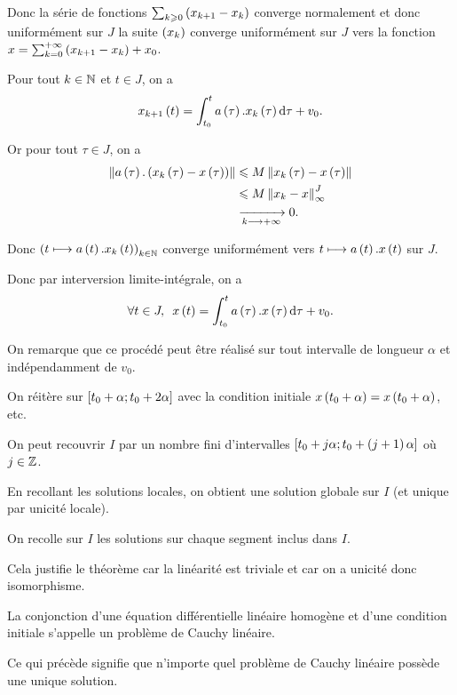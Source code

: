 \begin{dem}[Cas particulier : \(I=\intervii{c}{b}\) est un compact]
Donc la série de fonctions \(\sum_{k\geqslant0}\left(x_{k+1}-x_k\right)\) converge normalement et donc uniformément sur \(J\) \ie la suite \(\left(x_k\right)\) converge uniformément sur \(J\) vers la fonction \(x=\sum_{k=0}^{+\infty}\left(x_{k+1}-x_k\right)+x_0\).

Pour tout \(k\in\mathbb{N}\) et \(t\in J\), on a \[x_{k+1}\paren{t}=\int_{t_0}^ta\paren{\tau}.x_k\paren{\tau}\odif{\tau}+v_0.\]

Or pour tout \(\tau\in J\), on a \[\begin{aligned}
\norme{a\paren{\tau}.\paren{x_k\paren{\tau}-x\paren{\tau}}}&\leq M\norme{x_k\paren{\tau}-x\paren{\tau}} \\
&\leq M\norme{x_k-x}_\infty^J \\
&\tendqd{k\to\pinf}0.
\end{aligned}\]

Donc \(\left(t\longmapsto a\left(t\right).x_k\left(t\right)\right)_{k\in\mathbb{N}}\) converge uniformément vers \(t\longmapsto a\left(t\right).x\left(t\right)\) sur \(J\).

Donc par interversion limite-intégrale, on a \[\quantifs{\forall t\in J}x\paren{t}=\int_{t_0}^ta\paren{\tau}.x\paren{\tau}\odif{\tau}+v_0.\]

On remarque que ce procédé peut être réalisé sur tout intervalle de longueur \(\alpha\) et indépendamment de \(v_0\).

On réitère sur \(\left[t_0+\alpha;t_0+2\alpha\right]\) avec la condition initiale \(x\left(t_0+\alpha\right)=x\left(t_0+\alpha\right)\), etc.

On peut recouvrir \(I\) par un nombre fini d'intervalles \(\left[t_0+j\alpha;t_0+\left(j+1\right)\alpha\right]\) où \(j\in\mathbb{Z}\).

En recollant les solutions locales, on obtient une solution globale sur \(I\) (et unique par unicité locale).
\end{dem}

\begin{dem}
On recolle sur \(I\) les solutions sur chaque segment inclus dans \(I\).

Cela justifie le théorème car la linéarité est triviale et car on a unicité donc isomorphisme.
\end{dem}

La conjonction d'une équation différentielle linéaire homogène et d'une condition initiale s'appelle un problème de Cauchy linéaire.

Ce qui précède signifie que n'importe quel problème de Cauchy linéaire possède une unique solution.

